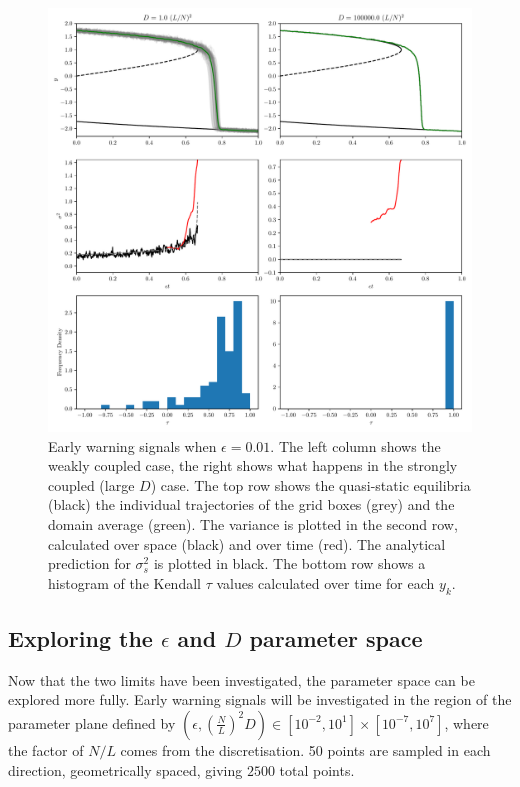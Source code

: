 \begin{figure}
  \centering
  \includegraphics[width=\textwidth,keepaspectratio]{coupled_variance}
  \caption[Early Warning Signals in the slowly forced limit]{Early warning signals when $\epsilon = 0.01$. The left column shows 
    the weakly coupled case, the right shows what happens in the strongly coupled (large $D$) case. 
    The top row shows the quasi-static equilibria (black) the individual
    trajectories of the grid boxes (grey) and the domain average (green).
    The variance is plotted in the second row, calculated over space 
    (black) and over time (red). The analytical prediction for $\sigma_s^2$ is plotted in black.
    The bottom row shows a histogram of the Kendall $\tau$ values calculated over time for each $y_k$.}
  \label{fig:coupled_timeseries}
\end{figure}

\subsection{Exploring the $\epsilon$ and $D$ parameter space}
Now that the two limits have been investigated, the parameter space can be explored more fully.
Early warning signals will be investigated in the region of the parameter plane defined by $(\epsilon,\left(\frac{N}{L}\right)^2 D) \in [10^{-2},10^1] \times [10^{-7}, 10^{7}]$,
where the factor of $N/L$ comes from the discretisation.
50 points are sampled in each direction, geometrically spaced, giving $2500$ total points.

